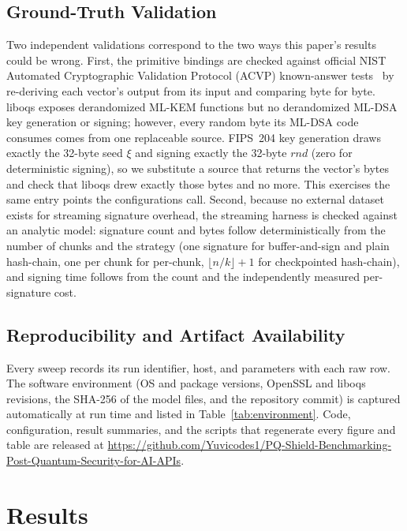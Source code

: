 \documentclass[conference]{IEEEtran}
\begin{document}
\subsection{Ground-Truth Validation}
Two independent validations correspond to the two ways this paper's results could be wrong. First,
the primitive bindings are checked against official NIST Automated Cryptographic Validation Protocol
(ACVP) known-answer tests~\cite{acvp} by
re-deriving each vector's output from its input and comparing byte for byte. liboqs exposes
derandomized ML-KEM functions but no derandomized ML-DSA key generation or signing; however, every
random byte its ML-DSA code consumes comes from one replaceable source. FIPS~204 key generation draws
exactly the 32-byte seed $\xi$ and signing exactly the 32-byte $\mathit{rnd}$ (zero for deterministic
signing), so we substitute a source that returns the vector's bytes and check that liboqs drew exactly
those bytes and no more. This exercises the same entry points the configurations call. Second, because no
external dataset exists for streaming signature overhead, the streaming harness is checked against an
analytic model: signature count and bytes follow deterministically from the number of chunks and the
strategy (one signature for buffer-and-sign and plain hash-chain, one per chunk for per-chunk,
$\lfloor n/k\rfloor+1$ for checkpointed hash-chain), and signing time follows from the count and the
independently measured per-signature cost.

\subsection{Reproducibility and Artifact Availability}
Every sweep records its run identifier, host, and parameters with each raw row. The software
environment (OS and package versions, OpenSSL and liboqs revisions, the SHA-256 of the model files,
and the repository commit) is captured automatically at run time and listed in
Table~\ref{tab:environment}. Code, configuration, result summaries, and the scripts that regenerate
every figure and table are released at
\url{https://github.com/Yuvicodes1/PQ-Shield-Benchmarking-Post-Quantum-Security-for-AI-APIs}.

\section{Results}\label{sec:results}
\end{document}
